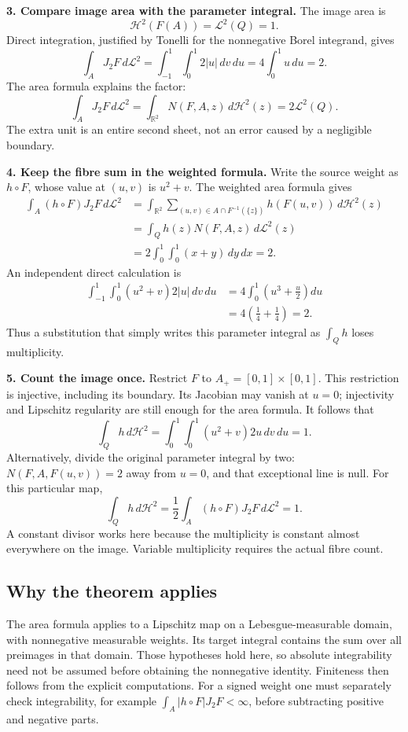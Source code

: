 \documentclass[
  11pt,
]{article}
\begin{document}
\textbf{3. Compare image area with the parameter integral.} The image
area is \[
\mathcal H^2(F(A))=\mathcal L^2(Q)=1.
\] Direct integration, justified by Tonelli for the nonnegative Borel
integrand, gives \[
\int_A J_2F\,d\mathcal L^2
=\int_{-1}^1\int_0^1 2|u|\,dv\,du
=4\int_0^1u\,du=2.
\] The area formula explains the factor: \[
\int_A J_2F\,d\mathcal L^2
=\int_{\mathbb R^2}N(F,A,z)\,d\mathcal H^2(z)=2\mathcal L^2(Q).
\] The extra unit is an entire second sheet, not an error caused by a
negligible boundary.

\textbf{4. Keep the fibre sum in the weighted formula.} Write the source
weight as \(h\circ F\), whose value at \((u,v)\) is \(u^2+v\). The
weighted area formula gives \[
\begin{aligned}
\int_A(h\circ F)J_2F\,d\mathcal L^2
&=\int_{\mathbb R^2}
\sum_{(u,v)\in A\cap F^{-1}(\{z\})}h(F(u,v))\,d\mathcal H^2(z)\\
&=\int_Qh(z)N(F,A,z)\,d\mathcal L^2(z)\\
&=2\int_0^1\int_0^1(x+y)\,dy\,dx=2.
\end{aligned}
\] An independent direct calculation is \[
\begin{aligned}
\int_{-1}^1\int_0^1(u^2+v)2|u|\,dv\,du
&=4\int_0^1\left(u^3+\frac u2\right)du\\
&=4\left(\frac14+\frac14\right)=2.
\end{aligned}
\] Thus a substitution that simply writes this parameter integral as
\(\int_Qh\) loses multiplicity.

\textbf{5. Count the image once.} Restrict \(F\) to
\(A_+=[0,1]\times[0,1]\). This restriction is injective, including its
boundary. Its Jacobian may vanish at \(u=0\); injectivity and Lipschitz
regularity are still enough for the area formula. It follows that \[
\int_Qh\,d\mathcal H^2
=\int_0^1\int_0^1(u^2+v)2u\,dv\,du=1.
\] Alternatively, divide the original parameter integral by two:
\(N(F,A,F(u,v))=2\) away from \(u=0\), and that exceptional line is
null. For this particular map, \[
\int_Qh\,d\mathcal H^2=\frac12\int_A(h\circ F)J_2F\,d\mathcal L^2=1.
\] A constant divisor works here because the multiplicity is constant
almost everywhere on the image. Variable multiplicity requires the
actual fibre count.

\subsection{Why the theorem applies}\label{why-the-theorem-applies-10}

The area formula applies to a Lipschitz map on a Lebesgue-measurable
domain, with nonnegative measurable weights. Its target integral
contains the sum over all preimages in that domain. Those hypotheses
hold here, so absolute integrability need not be assumed before
obtaining the nonnegative identity. Finiteness then follows from the
explicit computations. For a signed weight one must separately check
integrability, for example \(\int_A|h\circ F|J_2F<\infty\), before
subtracting positive and negative parts.
\end{document}
